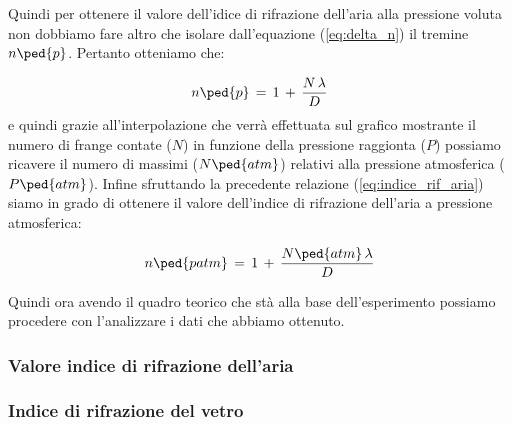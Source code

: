 Quindi per ottenere il valore dell'idice di rifrazione dell'aria alla pressione voluta non dobbiamo fare altro che isolare dall'equazione (\ref{eq:delta_n}) il tremine $n\ped{p}$. Pertanto otteniamo che:

\begin{equation}
	n\ped{p} \,=\, 1 \,+\, \frac{N \, \lambda}{D}
	\label{eq:indice_rif_aria}
\end{equation}
%
e quindi grazie all'interpolazione che verrà effettuata sul grafico mostrante il numero di frange contate ($N$) in funzione della pressione raggionta ($P$) possiamo ricavere il numero di massimi ($N\ped{atm}$) relativi alla pressione atmosferica ($P\ped{atm}$). Infine sfruttando la precedente relazione (\ref{eq:indice_rif_aria}) siamo in grado di ottenere il valore dell'indice di rifrazione dell'aria a pressione atmosferica:

\begin{equation}
	n\ped{patm} \,=\, 1 \,+\, \frac{N\ped{atm} \, \lambda}{D}
	\label{eq:indice_rif_aria_atm}
\end{equation}
%

Quindi ora avendo il quadro teorico che stà alla base dell'esperimento possiamo procedere con l'analizzare i dati che abbiamo ottenuto.

\subsubsection{Valore indice di rifrazione dell'aria}



%


\subsubsection{Indice di rifrazione del vetro}
